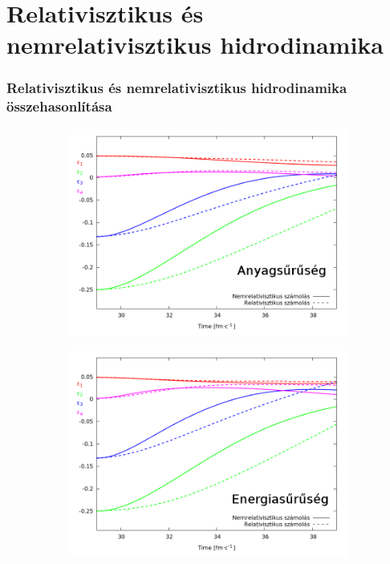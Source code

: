 \documentclass{beamer}
\begin{document}
\section{Relativisztikus és nemrelativisztikus hidrodinamika}
\begin{frame}[noframenumbering]
\frametitle{Relativisztikus és nemrelativisztikus hidrodinamika összehasonlítása}
\begin{center}
\begin{figure}[H]
	\centering
    \begin{subfigure}[b]{0.49\textwidth}
    		\includegraphics[width=\textwidth]{pic/res/relnonrel_n}
	\end{subfigure}
	\begin{subfigure}[b]{0.49\textwidth}
        	\includegraphics[width=\textwidth]{pic/res/relnonrel_e}
	\end{subfigure}
\end{figure}
\end{center}
\end{frame}
\end{document}
